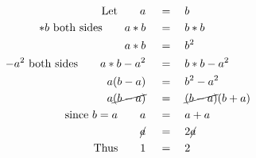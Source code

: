 \begin{align*}
\mathrm{Let}\qquad a\quad&\,=\quad b\\
*b~\mathrm{both~sides}\qquad a*b\quad&\,=\quad b*b\\
a*b\quad&\,=\quad b^2\\
-a^2~\mathrm{both~sides}\qquad a*b-a^2\quad&\,=\quad b*b-a^2\\
a(b-a)\quad&\,=\quad b^2-a^2\\
a\cancel{(b-a)}\quad&\,=\quad\cancel{(b-a)}(b+a)\\
\mathrm{since}~b=a\qquad a\quad&\,=\quad a+a\\
\cancel{a}\quad&\,=\quad2\cancel{a}\\
\mathrm{Thus}\qquad1\quad&\,=\quad2
\end{align*}

